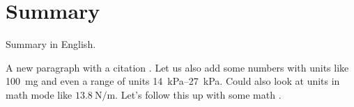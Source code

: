 \chapter*{Summary}

Summary in English. \blindtext

A new paragraph with a citation \cite{hildebrand2017whole}. Let us also add some numbers with units like \SI{100}{\milli\gram} and even a range of units \SIrange{14}{27}{\kilo\pascal}. \blindtext Could also look at units in math mode like $\SI{13.8}{\newton\per\metre}$. Let's follow this up with some math \cite{delpiano2018automated}.

\blindmathpaper
